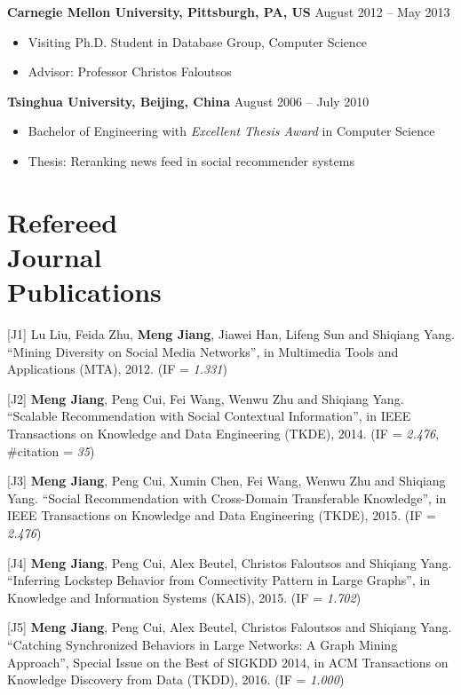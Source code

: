 \documentclass[margin, 10pt]{res}
\begin{document}
\begin{resume}
\textbf{Carnegie Mellon University, Pittsburgh, PA, US} \hfill{August 2012 -- May 2013}
\begin{itemize} \itemsep -2pt
\item Visiting Ph.D. Student in Database Group, Computer Science
\item Advisor: Professor Christos Faloutsos
\end{itemize}

\textbf{Tsinghua University, Beijing, China} \hfill{August 2006 -- July 2010}
\begin{itemize} \itemsep -2pt
\item Bachelor of Engineering with \textit{Excellent Thesis Award} in Computer Science
\item Thesis: Reranking news feed in social recommender systems
\end{itemize}


\section{Refereed \\ Journal \\ Publications}

[J1] Lu Liu, Feida Zhu, \textbf{Meng Jiang}, Jiawei Han, Lifeng Sun and Shiqiang Yang. ``Mining Diversity on Social Media Networks'', in Multimedia Tools and Applications (MTA), 2012. (IF = \textit{1.331})

[J2] \textbf{Meng Jiang}, Peng Cui, Fei Wang, Wenwu Zhu and Shiqiang Yang. ``Scalable Recommendation with Social Contextual Information'', in IEEE Transactions on Knowledge and Data Engineering (TKDE), 2014. (IF = \textit{2.476}, \#citation = \textit{35})

[J3] \textbf{Meng Jiang}, Peng Cui, Xumin Chen, Fei Wang, Wenwu Zhu and Shiqiang Yang. ``Social Recommendation with Cross-Domain Transferable Knowledge'', in IEEE Transactions on Knowledge and Data Engineering (TKDE), 2015. (IF = \textit{2.476})

[J4] \textbf{Meng Jiang}, Peng Cui, Alex Beutel, Christos Faloutsos and Shiqiang Yang. ``Inferring Lockstep Behavior from Connectivity Pattern in Large Graphs'', in Knowledge and Information Systems (KAIS), 2015. (IF = \textit{1.702})

[J5] \textbf{Meng Jiang}, Peng Cui, Alex Beutel, Christos Faloutsos and Shiqiang Yang. ``Catching Synchronized Behaviors in Large Networks: A Graph Mining Approach'', Special Issue on the Best of SIGKDD 2014, in ACM Transactions on Knowledge Discovery from Data (TKDD), 2016. (IF = \textit{1.000})


\end{resume}
\end{document}
